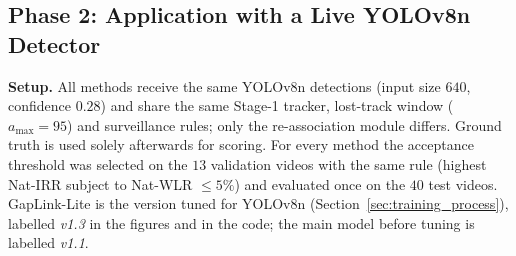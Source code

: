 \begin{table}[H]
    \centering
    \caption{Phase 1 --- online tracker on $40$ test sequences ($1{,}922$ injected occlusion intervals, $a_{\max}=95$)}
    \label{tab:tracker_results}
\end{table}

\subsection{Phase 2: Application with a Live YOLOv8n Detector}
\label{sec:phase2}

\textbf{Setup.} All methods receive the same YOLOv8n detections (input size $640$, confidence $0.28$) and share the same Stage-1 tracker, lost-track window ($a_{\max}=95$) and surveillance rules; only the re-association module differs. Ground truth is used solely afterwards for scoring. For every method the acceptance threshold was selected on the $13$ validation videos with the same rule (highest Nat-IRR subject to Nat-WLR $\le 5\%$) and evaluated once on the $40$ test videos. GapLink-Lite is the version tuned for YOLOv8n (Section~\ref{sec:training_process}), labelled \emph{v1.3} in the figures and in the code; the main model before tuning is labelled \emph{v1.1}.

